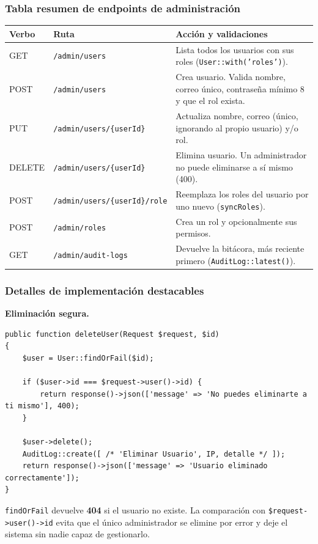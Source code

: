 \subsubsection{Tabla resumen de endpoints de administración}
\begin{longtable}{p{1.7cm}p{5.3cm}p{8cm}}
\toprule
\textbf{Verbo} & \textbf{Ruta} & \textbf{Acción y validaciones} \\
\midrule
\endhead
GET & \texttt{/admin/users} & Lista todos los usuarios con sus roles (\texttt{User::with('roles')}). \\
POST & \texttt{/admin/users} & Crea usuario. Valida nombre, correo único, contraseña mínimo 8 y que el rol exista. \\
PUT & \texttt{/admin/users/\{userId\}} & Actualiza nombre, correo (único, ignorando al propio usuario) y/o rol. \\
DELETE & \texttt{/admin/users/\{userId\}} & Elimina usuario. Un administrador no puede eliminarse a sí mismo (400). \\
POST & \texttt{/admin/users/\{userId\}/role} & Reemplaza los roles del usuario por uno nuevo (\texttt{syncRoles}). \\
POST & \texttt{/admin/roles} & Crea un rol y opcionalmente sus permisos. \\
GET & \texttt{/admin/audit-logs} & Devuelve la bitácora, más reciente primero (\texttt{AuditLog::latest()}). \\
\bottomrule
\end{longtable}

\subsubsection{Detalles de implementación destacables}
\textbf{Eliminación segura.}
\begin{lstlisting}[caption={AdminController::deleteUser}]
public function deleteUser(Request $request, $id)
{
    $user = User::findOrFail($id);

    if ($user->id === $request->user()->id) {
        return response()->json(['message' => 'No puedes eliminarte a ti mismo'], 400);
    }

    $user->delete();
    AuditLog::create([ /* 'Eliminar Usuario', IP, detalle */ ]);
    return response()->json(['message' => 'Usuario eliminado correctamente']);
}
\end{lstlisting}
\texttt{findOrFail} devuelve \textbf{404} si el usuario no existe. La comparación con \texttt{\$request->user()->id} evita que el único administrador se elimine por error y deje el sistema sin nadie capaz de gestionarlo.

